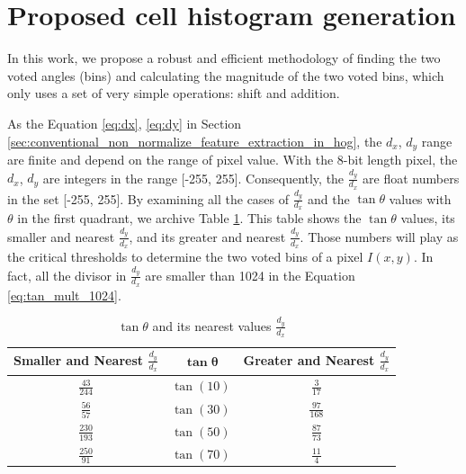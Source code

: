 %
%
\section{Proposed cell histogram generation}
\label{sec:proposed_non_normalize_feature_extraction}
In this work, we propose a robust and efficient methodology of finding the
two voted angles (bins) and calculating the magnitude of the two voted bins,
which  only uses a set of very simple operations: shift and
addition.

As the Equation \ref{eq:dx}, \ref{eq:dy} in Section
\ref{sec:conventional_non_normalize_feature_extraction_in_hog}, the $d_x$,
$d_y$ range are finite and depend on the range of pixel value.
With the 8-bit length pixel,  the $d_x$, $d_y$ are integers in the range [-255, 255].
Consequently, the $\frac{d_y}{d_x}$ are float numbers in the set [-255, 255].
By examining all the cases of $\frac{d_y}{d_x}$ and the $\tan\theta$ values with
$\theta$ in the first quadrant, we
archive Table \ref{tab:tanphi_and_its_nearest_values}.
This table shows the $\tan\theta$ values, its smaller and nearest
$\frac{d_y}{d_x}$, and its greater and nearest $\frac{d_y}{d_x}$.
Those numbers will play as the critical thresholds to determine the two voted bins of
a pixel $I(x,y)$.
In fact, all the divisor in $\frac{d_y}{d_x}$ are smaller than 1024 in the
Equation \ref{eq:tan_mult_1024}.

\begin{table}[t]
	\centering
	\caption{$\tan\theta$ and its nearest values $\frac{d_y}{d_x}$ }
	\label{tab:tanphi_and_its_nearest_values}
	\begin{tabular}{|c|c|c|}
		\hline
		\rowcolor{lightgray}
	\textbf{Smaller and Nearest $\frac{d_y}{d_x}$ } & $\mathbf{\tan\theta}$ & \textbf{Greater and Nearest $\frac{d_y}{d_x}$ }
		\\\hline
		$\frac{43}{244}$ &	$\tan(10)$ & $\frac{3}{17}$
		\\\hline
		$\frac{56}{57}$  & $\tan(30)$  & $\frac{97}{168}$
		\\\hline
		$\frac{230}{193}$ & $\tan(50)$ & $\frac{87}{73}$
		\\\hline
		$\frac{250}{91}$ & $\tan(70)$ & $\frac{11}{4}$
		\\\hline
	\end{tabular}
\end{table}

